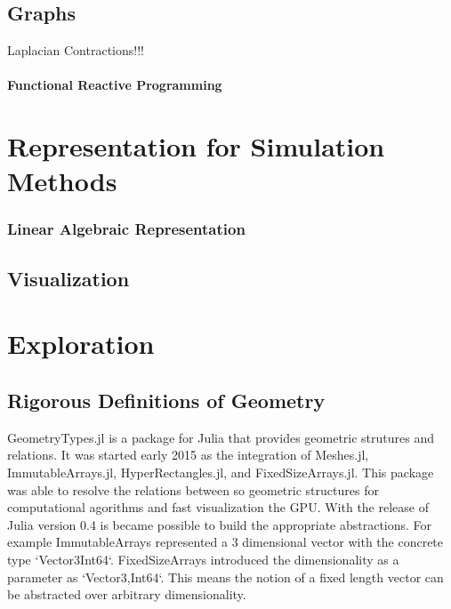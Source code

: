 \documentclass[a4paper]{article}
\begin{document}
\subsection{Graphs}

Laplacian Contractions!!!
\cite{Cao_Tagliasacchi_Olson_Zhang_Su_2010}

\paragraph{Functional Reactive Programming}

\section{Representation for Simulation Methods}


\subsubsection{Linear Algebraic Representation}
\cite{DiCarlo_Paoluzzi_Shapiro_2014}

\subsection{Visualization}
\cite{Tupper_2001}
\cite{Hijazi_Knoll_Schott_Kensler_Hansen_Hagen_2008}

\section{Exploration}

\subsection{Rigorous Definitions of Geometry}

GeometryTypes.jl is a package for Julia that provides geometric strutures and
relations. It was started early 2015 as the integration of Meshes.jl,
ImmutableArrays.jl, HyperRectangles.jl, and FixedSizeArrays.jl. This package
was able to resolve the relations between so geometric structures for
computational agorithms and fast visualization the GPU. With the
release of Julia version 0.4 is became possible to build the appropriate
abstractions. For example ImmutableArrays represented a 3 dimensional
vector with the concrete type `Vector3{Int64}`. FixedSizeArrays introduced
the dimensionality as a parameter as `Vector{3,Int64}`. This means the notion
of a fixed length vector can be abstracted over arbitrary dimensionality.
\end{document}

